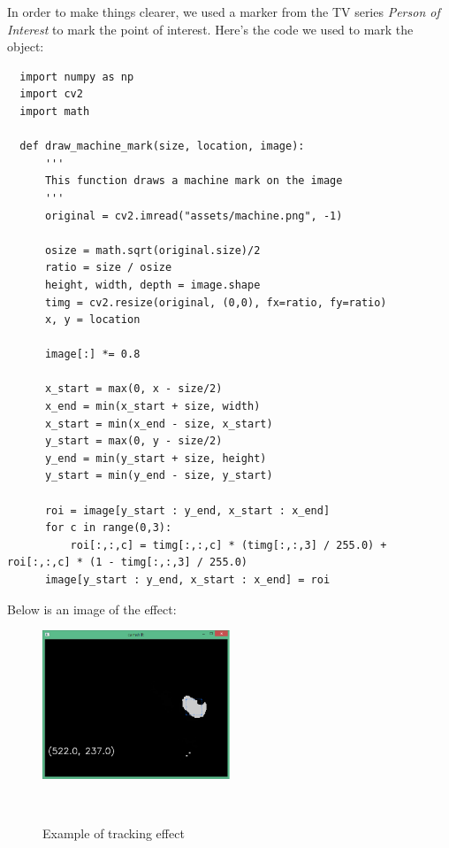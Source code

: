 In order to make things clearer, we used a marker from the TV series \emph{Person of Interest} to mark the point of interest.
Here's the code we used to mark the object:
\begin{verbatim}
  import numpy as np
  import cv2
  import math

  def draw_machine_mark(size, location, image):
      '''
      This function draws a machine mark on the image
      '''
      original = cv2.imread("assets/machine.png", -1)

      osize = math.sqrt(original.size)/2
      ratio = size / osize
      height, width, depth = image.shape
      timg = cv2.resize(original, (0,0), fx=ratio, fy=ratio)
      x, y = location 

      image[:] *= 0.8

      x_start = max(0, x - size/2)
      x_end = min(x_start + size, width)
      x_start = min(x_end - size, x_start)
      y_start = max(0, y - size/2)
      y_end = min(y_start + size, height)
      y_start = min(y_end - size, y_start)
      
      roi = image[y_start : y_end, x_start : x_end]
      for c in range(0,3):
          roi[:,:,c] = timg[:,:,c] * (timg[:,:,3] / 255.0) + roi[:,:,c] * (1 - timg[:,:,3] / 255.0) 
      image[y_start : y_end, x_start : x_end] = roi
\end{verbatim}
Below is an image of the effect:\\
\begin{figure}[h!]

  \centering
    \includegraphics[width=0.5\textwidth]{../Pictures/after.png}
    \caption{Example of tracking effect}\\
\end{figure}